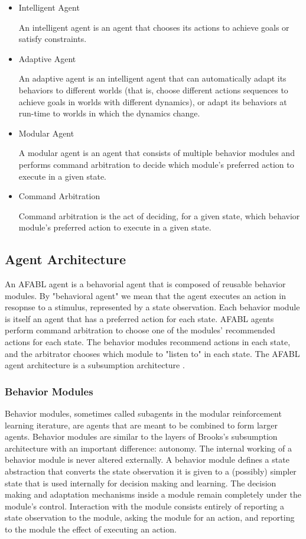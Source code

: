 \begin{itemize}
\item Intelligent Agent

  An intelligent agent is an agent that chooses its actions to achieve
  goals or satisfy constraints.

\item Adaptive Agent

  An adaptive agent is an intelligent agent that can automatically
  adapt its behaviors to different worlds (that is, choose different
  actions sequences to achieve goals in worlds with different
  dynamics), or adapt its behaviors at run-time to worlds in which the
  dynamics change.

\item Modular Agent

  A modular agent is an agent that consists of multiple behavior
  modules and performs command arbitration to decide which module's
  preferred action to execute in a given state.

\item Command Arbitration

  Command arbitration is the act of deciding, for a given state, which
  behavior module's preferred action to execute in a given state.
\end{itemize}

\subsection{Agent Architecture}

An AFABL agent is a behavorial agent that is composed of reusable behavior modules.  By "behavioral agent" we mean that the agent executes an action in resopnse to a stimulus, represented by a state observation.  Each behavior module is itself an agent that has a preferred action for each state.  AFABL agents perform command arbitration to choose one of the modules' recommended actions for each state.  The behavior modules recommend actions in each state, and the arbitrator chooses which module to "listen to" in each state.  The AFABL agent architecture is a subsumption architecture \cite{brooks1986a-layered}.

\subsubsection{Behavior Modules}

Behavior modules, sometimes called subagents in the modular reinforcement learning iterature, are agents that are meant to be combined to form larger agents.  Behavior modules are similar to the layers of Brooks's subsumption architecture with an important difference: autonomy.  The internal working of a behavior module is never altered externally.  A behavior module defines a state abstraction that converts the state observation it is given to a (possibly) simpler state that is used internally for decision making and learning.  The decision making and adaptation mechanisms inside a module remain completely under the module's control.  Interaction with the module consists entirely of reporting a state observation to the module, asking the module for an action, and reporting to the module the effect of executing an action.

